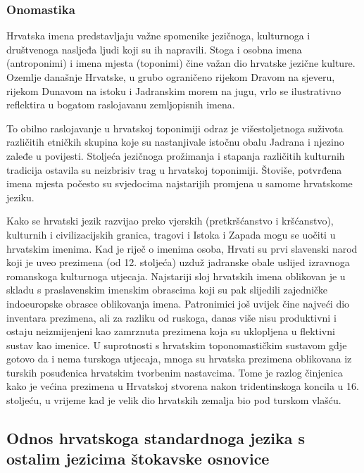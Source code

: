 \begin{multicols}{2}
\subsubsection{Onomastika}

Hrvatska imena predstavljaju važne spomenike jezičnoga, kulturnoga i društvenoga nasljeđa ljudi koji su ih napravili. Stoga i osobna imena (antroponimi) i imena mjesta (toponimi) čine važan dio hrvatske jezične kulture. Ozemlje današnje Hrvatske, u grubo ograničeno rijekom Dravom na sjeveru, rijekom Dunavom na istoku i Jadranskim morem na jugu, vrlo se ilustrativno reflektira u bogatom raslojavanu zemljopisnih imena.


To obilno raslojavanje u hrvatskoj toponimiji odraz je višestoljetnoga suživota različitih etničkih skupina koje su nastanjivale istočnu obalu Jadrana i njezino zaleđe u povijesti. Stoljeća jezičnoga prožimanja i stapanja različitih kulturnih tradicija ostavila su neizbrisiv trag u hrvatskoj toponimiji. Štoviše, potvrđena imena mjesta počesto su svjedocima najstarijih promjena u samome hrvatskome jeziku.

Kako se hrvatski jezik razvijao preko vjerskih (pretkršćanstvo i kršćanstvo), kulturnih i civilizacijskih granica, tragovi i Istoka i Zapada mogu se uočiti u hrvatskim imenima. Kad je riječ o imenima osoba, Hrvati su prvi slavenski narod koji je uveo prezimena (od 12. stoljeća) uzduž jadranske obale uslijed izravnoga romanskoga kulturnoga utjecaja. Najstariji sloj hrvatskih imena oblikovan je u skladu s praslavenskim imenskim obrascima koji su pak slijedili zajedničke indoeuropske obrasce oblikovanja imena. Patronimici još uvijek čine najveći dio inventara prezimena, ali za razliku od ruskoga, danas više nisu produktivni i ostaju neizmijenjeni kao zamrznuta prezimena koja su uklopljena u flektivni sustav kao imenice. U suprotnosti s hrvatskim toponomastičkim sustavom gdje gotovo da i nema turskoga utjecaja, mnoga su hrvatska prezimena oblikovana iz turskih posuđenica hrvatskim tvorbenim nastavcima. Tome je razlog činjenica kako je većina prezimena u Hrvatskoj stvorena nakon tridentinskoga koncila u 16. stoljeću, u vrijeme kad je velik dio hrvatskih zemalja bio pod turskom vlašću.

\subsection{Odnos hrvatskoga standardnoga jezika s ostalim jezicima štokavske osnovice}


\end{multicols}
